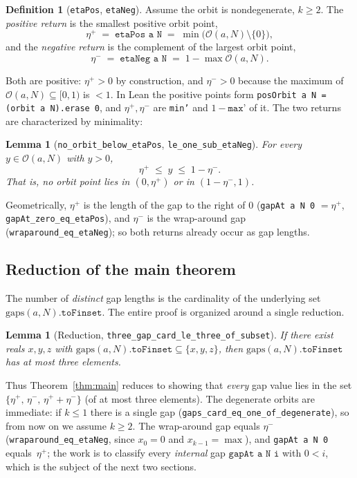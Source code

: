 \documentclass[11pt,reqno]{amsart}
\theoremstyle{plain}
\newtheorem{lemma}[theorem]{Lemma}
\theoremstyle{definition}
\newtheorem{definition}[theorem]{Definition}
\theoremstyle{remark}
\newcommand{\etap}{\eta^{+}}
\newcommand{\etam}{\eta^{-}}
\newcommand{\orb}{\mathcal{O}}
\newcommand{\code}[1]{\texttt{#1}}
\begin{document}
\begin{definition}[\code{etaPos}, \code{etaNeg}]\label{def:returns}
Assume the orbit is nondegenerate, $k\ge 2$.  The \emph{positive return} is the
smallest positive orbit point,
\[
  \etap \;=\; \code{etaPos a N} \;=\; \min\bigl(\orb(a,N)\setminus\{0\}\bigr),
\]
and the \emph{negative return} is the complement of the largest orbit point,
\[
  \etam \;=\; \code{etaNeg a N} \;=\; 1 - \max\orb(a,N).
\]
\end{definition}

Both are positive: $\etap>0$ by construction, and $\etam>0$ because the maximum
of $\orb(a,N)\subseteq[0,1)$ is $<1$.  In Lean the positive points form
\code{posOrbit a N = (orbit a N).erase 0}, and $\etap,\etam$ are \code{min'} and
$1-\code{max'}$ of it.  The two returns are characterized by minimality:

\begin{lemma}[\code{no\_orbit\_below\_etaPos}, \code{le\_one\_sub\_etaNeg}]
\label{lem:return-min}
For every $y\in\orb(a,N)$ with $y>0$,
\[
  \etap \;\le\; y \;\le\; 1-\etam .
\]
That is, no orbit point lies in $(0,\etap)$ or in $(1-\etam,1)$.
\end{lemma}

Geometrically, $\etap$ is the length of the gap to the right of $0$
(\code{gapAt a N 0} $=\etap$, \code{gapAt\_zero\_eq\_etaPos}), and $\etam$ is the
wrap-around gap (\code{wraparound\_eq\_etaNeg}); so both returns already occur as
gap lengths.

\subsection{Reduction of the main theorem}

The number of \emph{distinct} gap lengths is the cardinality of the underlying
set $\mathrm{gaps}(a,N).\code{toFinset}$.  The entire proof is organized around
a single reduction.

\begin{lemma}[Reduction, \code{three\_gap\_card\_le\_three\_of\_subset}]\label{lem:reduction}
If there exist reals $x,y,z$ with
$\mathrm{gaps}(a,N).\code{toFinset} \subseteq \{x,y,z\}$, then
$\mathrm{gaps}(a,N).\code{toFinset}$ has at most three elements.
\end{lemma}

Thus Theorem~\ref{thm:main} reduces to showing that \emph{every} gap value lies
in the set $\{\etap,\,\etam,\,\etap+\etam\}$ (of at most three elements).  The degenerate
orbits are immediate: if $k\le 1$ there is a single gap
(\code{gaps\_card\_eq\_one\_of\_degenerate}), so from now on we assume $k\ge 2$.
The wrap-around gap equals $\etam$ (\code{wraparound\_eq\_etaNeg}, since
$x_0=0$ and $x_{k-1}=\max$), and \code{gapAt a N 0}
equals~$\etap$; the work is to classify every \emph{internal} gap
$\code{gapAt a N i}$ with $0<i$, which is the subject of the next two sections.
\end{document}
